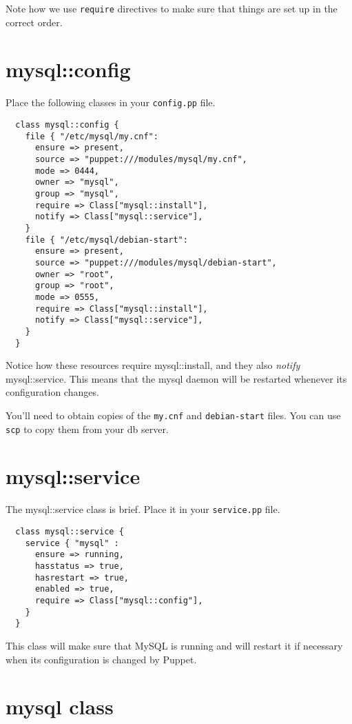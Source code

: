 \documentclass{article}   	%
\begin{document}
Note how we use \texttt{require} directives to make sure that things are set up in the correct order.

\newpage

\section{mysql::config}
Place the following classes in your \texttt{config.pp} file.

\begin{verbatim}
  class mysql::config {
    file { "/etc/mysql/my.cnf":
      ensure => present,
      source => "puppet:///modules/mysql/my.cnf",
      mode => 0444,
      owner => "mysql",
      group => "mysql",
      require => Class["mysql::install"],
      notify => Class["mysql::service"],
    }
    file { "/etc/mysql/debian-start":
      ensure => present,
      source => "puppet:///modules/mysql/debian-start",
      owner => "root",
      group => "root",
      mode => 0555,
      require => Class["mysql::install"],
      notify => Class["mysql::service"],
    }
  }
\end{verbatim}

Notice how these resources require mysql::install, and they also \emph{notify} mysql::service.  This means that the mysql daemon will be restarted whenever its configuration changes.

You'll need to obtain copies of the \texttt{my.cnf} and \texttt{debian-start} files.  You can use \texttt{scp} to copy them from your db server.

\section{mysql::service}
The mysql::service class is brief.  Place it in your \texttt{service.pp} file.

\begin{verbatim}
  class mysql::service {
    service { "mysql" :
      ensure => running,
      hasstatus => true,
      hasrestart => true,
      enabled => true,
      require => Class["mysql::config"],
    }
  }
\end{verbatim}

This class will make sure that MySQL is running and will restart it if necessary when its configuration is changed by Puppet.

\section{mysql class}
\end{document}
